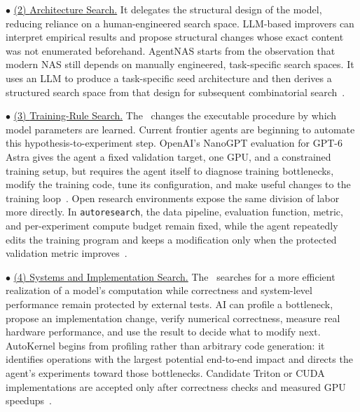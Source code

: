 \noindent$\bullet$ \underline{(2) {Architecture Search.}}
It delegates the structural design of the model, reducing reliance on a human-engineered search space.
LLM-based improvers can interpret empirical results and propose structural changes whose exact content was not enumerated beforehand. %
AgentNAS starts from the observation that modern NAS still depends on manually engineered, task-specific search spaces. It uses an LLM to produce a task-specific seed architecture and then derives a structured search space from that design for subsequent combinatorial search~\cite{jeong2026agentnas}.


\noindent$\bullet$ \underline{(3) {Training-Rule Search.}}
The \Improver\ changes the executable procedure by which model parameters are learned.
Current frontier agents are beginning to automate this hypothesis-to-experiment step. OpenAI's NanoGPT evaluation for GPT-6 Astra gives the agent a fixed validation target, one GPU, and a constrained training setup, but requires the agent itself to diagnose training bottlenecks, modify the training code, tune its configuration, and make useful changes to the training loop~\cite{openai2026gpt6astra}.
Open research environments expose the same division of labor more directly. In \texttt{autoresearch}, the data pipeline, evaluation function, metric, and per-experiment compute budget remain fixed, while the agent repeatedly edits the training program and keeps a modification only when the protected validation metric improves~\cite{karpathy2026autoresearch}.

\noindent$\bullet$ \underline{(4) {Systems and Implementation Search.}}
The \Improver \ searches for a more efficient realization of a model's computation while correctness and system-level performance remain protected by external tests.
AI can profile a bottleneck, propose an implementation change, verify numerical correctness, measure real hardware performance, and use the result to decide what to modify next.
AutoKernel begins from profiling rather than arbitrary code generation: it identifies operations with the largest potential end-to-end impact and directs the agent's experiments toward those bottlenecks. Candidate Triton or CUDA implementations are accepted only after correctness checks and measured GPU speedups~\cite{jaber2026autokernel}.


